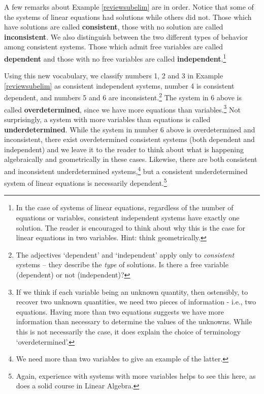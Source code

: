 A few remarks about Example \ref{reviewsubelim} are in order.  Notice that some of the systems of linear equations had solutions while others did not.  Those which have solutions are called \textbf{consistent}, those with no solution are called \textbf{inconsistent}.  We also distinguish between the two different types of behavior among consistent systems. Those which admit free variables are called \textbf{dependent} and those with no free variables are called \textbf{independent}.\footnote{In the case of systems of linear equations, regardless of the number of equations or variables, consistent independent systems have exactly one solution.  The reader is encouraged to think about why this is the case for linear equations in two variables.  Hint: think geometrically.}   

Using this new vocabulary, we classify numbers 1, 2 and 3 in Example \ref{reviewsubelim} as consistent independent systems, number 4 is consistent dependent, and numbers 5 and 6 are inconsistent.\footnote{The adjectives `dependent' and `independent' apply only to \textit{consistent} systems -- they describe the \textit{type} of solutions.  Is there a free variable (dependent) or not (independent)?}  The system in 6 above is called \textbf{overdetermined}, since we have more equations  than variables.\footnote{If we think if each variable being an unknown quantity, then ostensibly, to recover two unknown quantities, we need two pieces of information - i.e., two equations.  Having more than two equations suggests we have more information than necessary to determine the values of the unknowns.  While this is not necessarily the case, it does explain the choice of terminology `overdetermined'.}  Not surprisingly, a system with more variables than equations is called \textbf{underdetermined}.  While the system in number 6 above is overdetermined and inconsistent, there exist overdetermined consistent systems (both dependent and independent) and we leave it to the reader to think about what is happening algebraically and geometrically in these cases.  Likewise, there are both consistent and inconsistent underdetermined systems,\footnote{We need more than two variables to give an example of the latter.} but a consistent underdetermined system of linear equations is necessarily dependent.\footnote{Again, experience with systems with more variables helps to see this here, as does a solid course in Linear Algebra.}  

